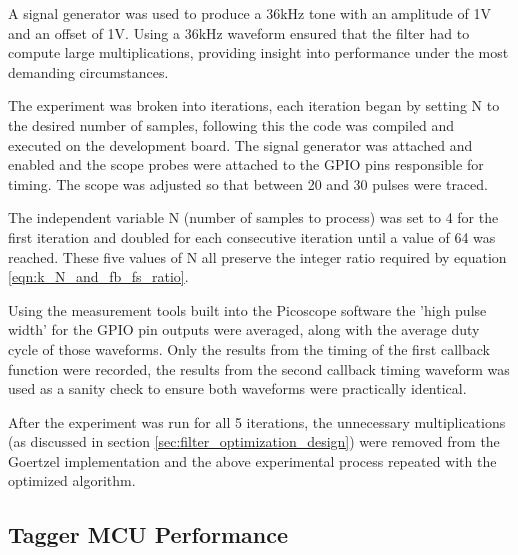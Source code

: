 A signal generator was used to produce a 36kHz tone with an amplitude of 1V and an offset of 1V. Using a 36kHz waveform ensured that the filter had to compute large multiplications, providing insight into performance under the most demanding circumstances.

The experiment was broken into iterations, each iteration began by setting N to the desired number of samples, following this the code was compiled and executed on the development board. The signal generator was attached and enabled and the scope probes were attached to the GPIO pins responsible for timing. The scope was adjusted so that between 20 and 30 pulses were traced. 

The independent variable N (number of samples to process) was set to 4 for the first iteration and doubled for each consecutive iteration until a value of 64 was reached. These five values of N all preserve the integer ratio required by equation \ref{eqn:k_N_and_fb_fs_ratio}.

Using the measurement tools built into the Picoscope software the 'high pulse width' for the GPIO pin outputs were averaged, along with the average duty cycle of those waveforms. Only the results from the timing of the first callback function were recorded, the results from the second callback timing waveform was used as a sanity check to ensure both waveforms were practically identical.


After the experiment was run for all 5 iterations, the unnecessary multiplications (as discussed in section \ref{sec:filter_optimization_design}) were removed from the Goertzel implementation and the above experimental process repeated with the optimized algorithm.







\subsection{Tagger MCU Performance}

